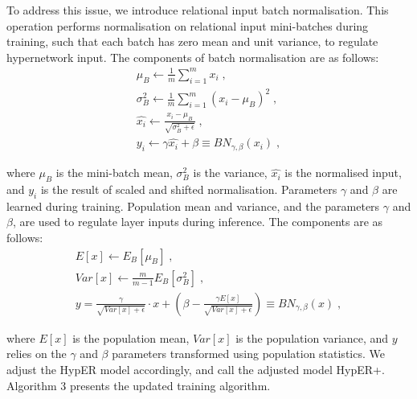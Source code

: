 \noindent To address this issue, we introduce relational input batch normalisation. This operation performs normalisation on relational input mini-batches during training, such that each batch has zero mean and unit variance, to regulate hypernetwork input. The components of batch normalisation are as follows: 
\begin{subequations}
	\begin{gather}
		\mu_B \gets \frac{1}{m} \sum_{i=1}^m x_i \; , \\
		\sigma_B^2 \gets \frac{1}{m} \sum_{i=1}^m (x_i - \mu_B)^2 \; , \\
		\hat{x_i} \gets \frac{x_i - \mu_B}{\sqrt{\sigma_B^2 + \epsilon}} \; , \\
		y_i \gets \gamma \hat{x_i} + \beta \equiv BN_{\gamma, \beta}(x_i) \; ,
	\end{gather}
\end{subequations}

\noindent where $ \mu_B $ is the mini-batch mean, $ \sigma_B^2 $ is the variance, $ \hat{x_i} $ is the normalised input, and $ y_i $ is the result of scaled and shifted normalisation. Parameters $ \gamma $ and $ \beta $ are learned during training. Population mean and variance, and the parameters $ \gamma $ and $ \beta $, are used to regulate layer inputs during inference. The components are as follows: 
\begin{subequations}
	\begin{gather}
		E[x] \gets E_B[\mu_B] \; , \\
		Var[x] \gets \frac{m}{m - 1} E_B[\sigma_B^2] \; , \\
		y = \frac{\gamma}{\sqrt{Var[x] + \epsilon}} \cdot x + \left(\beta - \frac{\gamma E[x]}{\sqrt{Var[x] + \epsilon}}\right) \equiv BN_{\gamma, \beta}(x) \; ,
	\end{gather}
\end{subequations}

\noindent where $ E[x] $ is the population mean, $ Var[x] $ is the population variance, and $ y $ relies on the $ \gamma $ and $ \beta $ parameters transformed using population statistics. We adjust the HypER model accordingly, and call the adjusted model HypER+. Algorithm 3 presents the updated training algorithm. 

